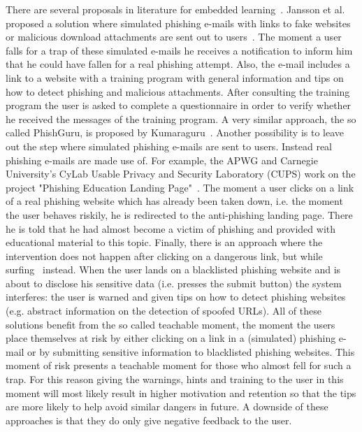 There are several proposals in literature for embedded learning~\cite{jannson2011simulating, kumaraguru2009phishguru,alnajim2009antiphishing}. 
Jansson et al. proposed a solution where simulated phishing e-mails with links to fake websites or malicious download attachments are sent out to users~\cite{jannson2011simulating}. 
The moment a user falls for a trap of these simulated e-mails he receives a notification to inform him that he could have fallen for a real phishing attempt. 
Also, the e-mail includes a link to a website with a training program with general information and tips on how to detect phishing and malicious attachments. 
After consulting the training program the user is asked to complete a questionnaire in order to verify whether he received the messages of the training program. 
A very similar approach, the so called PhishGuru, is proposed by Kumaraguru~\cite{kumaraguru2009phishguru}. 
Another possibility is to leave out the step where simulated phishing e-mails are sent to users. 
Instead real phishing e-mails are made use of. 
For example, the APWG and Carnegie University's CyLab Usable Privacy and Security Laboratory (CUPS) work on the project "Phishing Education Landing Page"~\cite{apwg2009landingpage}. 
The moment a user clicks on a link of a real phishing website which has already been taken down, i.e. the moment the user behaves riskily, he is redirected to the anti-phishing landing page.
There he is told that he had almost become a victim of phishing and provided with educational material to this topic. 
Finally, there is an approach where the intervention does not happen after clicking on a dangerous link, but while surfing~\cite{alnajim2009antiphishing} instead. 
When the user lands on a blacklisted phishing website and is about to disclose his sensitive data (i.e. presses the submit button) the system interferes: 
the user is warned and given tips on how to detect phishing websites (e.g. abstract information on the detection of spoofed URLs). 
All of these solutions benefit from the so called teachable moment, the moment the users place themselves at risk by either clicking on a link in a (simulated) phishing e-mail or by submitting sensitive information to blacklisted phishing websites. 
This moment of risk presents a teachable moment for those who almost fell for such a trap. 
For this reason giving the warnings, hints and training to the user in this moment will most likely result in higher motivation and retention so that the tips are more likely to help avoid similar dangers in future. 
A downside of these approaches is that they do only give negative feedback to the user. 
